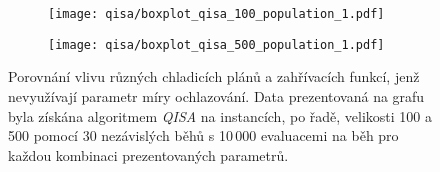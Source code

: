 \begin{figure}[ht!]
    \centering
    \begin{subfigure}[b]{0.48\linewidth}
        \texttt{[image: qisa/boxplot\_qisa\_100\_population\_1.pdf]}
    \end{subfigure}
    \hfill
    \begin{subfigure}[b]{0.48\linewidth}
        \texttt{[image: qisa/boxplot\_qisa\_500\_population\_1.pdf]}
    \end{subfigure}
    \caption{Porovnání vlivu různých chladicích plánů a zahřívacích funkcí, jenž nevyužívají parametr míry ochlazování. Data prezentovaná na grafu byla získána algoritmem \emph{QISA} na instancích, po řadě, velikosti 100 a 500 pomocí 30 nezávislých běhů s 10\,000 evaluacemi na běh pro každou kombinaci prezentovaných parametrů.}
    \label{fig:qisa-boxplot}
\end{figure}

